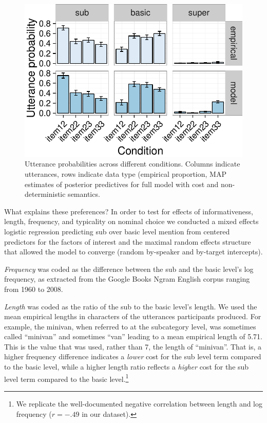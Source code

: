 \documentclass[11pt]{article}
\begin{document}
\begin{figure}
\centering
\includegraphics[width=.7\textwidth]{../../../models/5d_bda_nom_full/graphs/qualitativepattern-fulldataset-typicalities-hmc}
\caption{Utterance probabilities across different conditions. Columns indicate utterances, rows indicate data type (empirical proportion, MAP estimates of posterior predictives for full model with cost and non-deterministic semantics.}
\label{fig:exp2results}
\end{figure}

What explains these preferences? In order to test for effects of informativeness, length, frequency, and typicality on nominal choice we conducted a mixed effects logistic regression predicting sub over basic level mention from centered predictors for the factors of interest and the maximal random effects structure that allowed the model to converge (random by-speaker and by-target intercepts). 

\emph{Frequency} was coded as the difference between the sub and the basic level's log frequency, as extracted from the Google Books Ngram English corpus ranging from 1960 to 2008. 

\emph{Length} was coded as the ratio of the sub to the basic level's length. We used the mean empirical lengths in characters of the utterances participants produced. For example, the minivan, when referred to at the subcategory level, was sometimes called ``minivan'' and sometimes ``van'' leading to a mean empirical length of 5.71. This is the value that was used, rather than 7, the length of ``minivan''. That is, a higher frequency difference indicates a \emph{lower} cost for the sub level term compared to the basic level, while a higher length ratio reflects a \emph{higher} cost for the sub level term compared to the basic level.\footnote{We replicate the well-documented negative correlation between length and log frequency ($r = -.49$ in our dataset).} 
\end{document}
